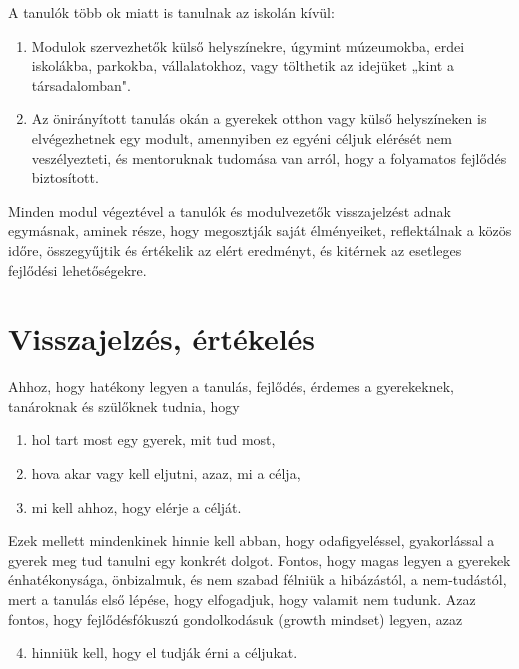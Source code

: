 A tanulók több ok miatt is tanulnak az iskolán kívül:
\begin{enumerate}
  \item Modulok szervezhetők külső helyszínekre, úgymint múzeumokba, erdei
        iskolákba, parkokba, vállalatokhoz, vagy tölthetik az idejüket „kint a
        társadalomban".

  \item Az önirányított tanulás okán a gyerekek otthon vagy külső helyszíneken is
        elvégezhetnek egy modult, amennyiben ez egyéni céljuk elérését nem
        veszélyezteti, és mentoruknak tudomása van arról, hogy a folyamatos fejlődés
        biztosított.
\end{enumerate}

Minden modul végeztével a tanulók és modulvezetők visszajelzést adnak
egymásnak, aminek része, hogy megosztják saját élményeiket, reflektálnak a
közös időre, összegyűjtik és értékelik az elért eredményt, és kitérnek az
esetleges fejlődési lehetőségekre.

\section{Visszajelzés, értékelés}
\label{sec:ertekeles}
Ahhoz, hogy hatékony legyen a tanulás, fejlődés, érdemes a gyerekeknek,
tanároknak és szülőknek tudnia, hogy
\begin{enumerate}
  \item hol tart most egy gyerek, mit tud most,
  \item hova akar vagy kell eljutni, azaz, mi a célja,
  \item mi kell ahhoz, hogy elérje a célját.
\end{enumerate}
Ezek mellett mindenkinek hinnie kell abban, hogy odafigyeléssel, gyakorlással a
gyerek meg tud tanulni egy konkrét dolgot. Fontos, hogy magas legyen a gyerekek
énhatékonysága, önbizalmuk, és nem szabad félniük a hibázástól, a nem-tudástól,
mert a tanulás első lépése, hogy elfogadjuk, hogy valamit nem tudunk. Azaz
fontos, hogy fejlődésfókuszú gondolkodásuk (growth mindset)
\citep{growthmindset} legyen, azaz
\begin{enumerate}
  \setcounter{enumi}{3}
  \item hinniük kell, hogy el tudják érni a céljukat.
\end{enumerate}

